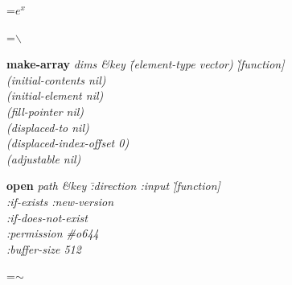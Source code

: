{\newpage
\clearpage
\samepage 
\setbox\sizebox=\hbox{$e^{x}$}\box\sizebox
}

{\newpage
\clearpage
\samepage 
}

{\newpage
\clearpage
\samepage 
\setbox\sizebox=\hbox{$\backslash$}\box\sizebox
}

{\newpage
\clearpage
\samepage 
}

{\newpage
\clearpage
\samepage 
\begin{emtabbing}{\bf make-array} 
\it 
dims \&key \= (element-type vector) \` [function] \\  
\> (initial-contents nil) \\  
\> (initial-element nil) \\  
\> (fill-pointer nil)  \\  
\> (displaced-to nil) \\  
\> (displaced-index-offset 0) \\  
\> (adjustable nil)
\rm
\end{emtabbing}
}

{\newpage
\clearpage
\samepage 
}

{\newpage
\clearpage
\samepage 
\begin{emtabbing}{\bf open} 
\it path \&key \= :direction :input \`[function]\\  
 \> :if-exists :new-version \\  
 \> :if-does-not-exist \\  
 \> :permission \#o644 \\  
 \> :buffer-size 512\\  
\rm
\end{emtabbing}
}

{\newpage
\clearpage
\samepage 
\setbox\sizebox=\hbox{$\sim$}\box\sizebox
}

